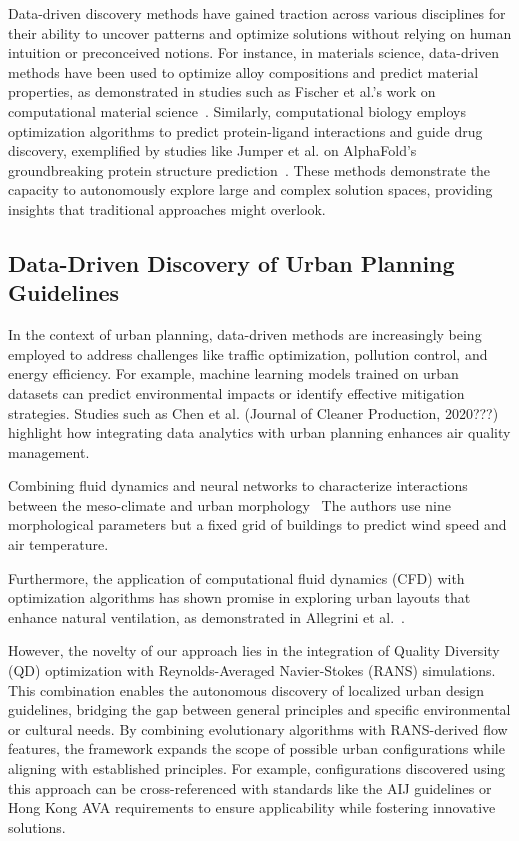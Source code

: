 \documentclass[times,final]{elsarticle}
\begin{document}
Data-driven discovery methods have gained traction across various disciplines for their ability to uncover patterns and optimize solutions without relying on human intuition or preconceived notions. For instance, in materials science, data-driven methods have been used to optimize alloy compositions and predict material properties, as demonstrated in studies such as Fischer et al.'s work on computational material science~\cite{fischer2006predicting}. Similarly, computational biology employs optimization algorithms to predict protein-ligand interactions and guide drug discovery, exemplified by studies like Jumper et al. on AlphaFold's groundbreaking protein structure prediction~\cite{jumper2021highly}. These methods demonstrate the capacity to autonomously explore large and complex solution spaces, providing insights that traditional approaches might overlook.



\subsection{Data-Driven Discovery of Urban Planning Guidelines}

In the context of urban planning, data-driven methods are increasingly being employed to address challenges like traffic optimization, pollution control, and energy efficiency. For example, machine learning models trained on urban datasets can predict environmental impacts or identify effective mitigation strategies. Studies such as Chen et al. (Journal of Cleaner Production, 2020???) highlight how integrating data analytics with urban planning enhances air quality management. 

Combining fluid dynamics and neural networks to characterize interactions between the meso-climate and urban morphology~\cite{javanroodi2022combining}
The authors use nine morphological parameters but a fixed grid of buildings to predict wind speed and air temperature.


Furthermore, the application of computational fluid dynamics (CFD) with optimization algorithms has shown promise in exploring urban layouts that enhance natural ventilation, as demonstrated in Allegrini et al.~\cite{allegrini2015coupled}.

However, the novelty of our approach lies in the integration of Quality Diversity (QD) optimization with Reynolds-Averaged Navier-Stokes (RANS) simulations. This combination enables the autonomous discovery of localized urban design guidelines, bridging the gap between general principles and specific environmental or cultural needs. By combining evolutionary algorithms with RANS-derived flow features, the framework expands the scope of possible urban configurations while aligning with established principles. For example, configurations discovered using this approach can be cross-referenced with standards like the AIJ guidelines or Hong Kong AVA requirements to ensure applicability while fostering innovative solutions.
\end{document}
